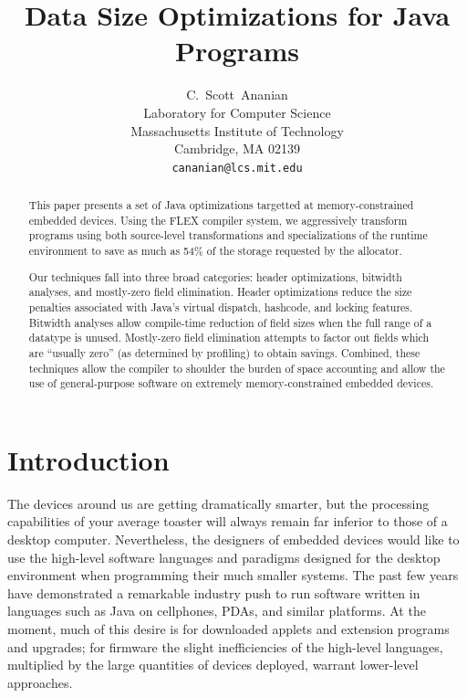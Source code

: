 \documentclass[preprint]{acmconf}
\title{\bf Data Size Optimizations for Java Programs}
\author{C.~Scott~Ananian \\
	Laboratory for Computer Science\\
	Massachusetts Institute of Technology\\ 
	Cambridge, MA 02139 \\ 
	{\tt cananian@lcs.mit.edu} }
\begin{document}


\maketitle

\begin{abstract}

This paper presents a set of Java optimizations targetted at
memory-constrained embedded devices.  Using the FLEX compiler system,
we aggressively transform
programs using both source-level transformations and
specializations of the runtime environment to save as much
as 54\% of the storage requested by the allocator.

Our techniques fall into three broad categories: header optimizations,
bitwidth analyses, and mostly-zero field elimination.  Header
optimizations reduce the size penalties associated with 
Java's virtual dispatch, hashcode, and locking features.  Bitwidth
analyses allow compile-time reduction of field sizes when the
full range of a datatype is unused.  Mostly-zero field elimination
attempts to factor out fields which are ``usually zero'' (as
determined by profiling) to obtain savings.  Combined, these
techniques allow the compiler to shoulder the burden of space accounting
and allow the use of general-purpose software on extremely
memory-constrained embedded devices.

\end{abstract}

\section{Introduction}
The devices around us are getting dramatically smarter, but the
processing capabilities of your average toaster will always remain far
inferior to those of a desktop computer.  Nevertheless, the designers
of embedded devices would like to use the high-level software
languages and paradigms designed for the desktop environment when
programming their much smaller systems.  The past few years have
demonstrated a remarkable industry push to run software written in
languages such as Java on cellphones, PDAs, and similar platforms.
At the moment, much of this desire is for downloaded applets and
extension programs and upgrades; for firmware the slight
inefficiencies of the high-level languages, multiplied by the large
quantities of devices deployed, warrant lower-level approaches.
\end{document}
